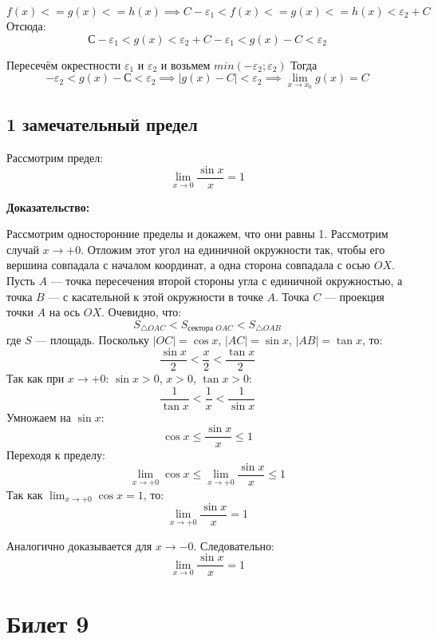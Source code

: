 \documentclass{article}
\begin{document}
\begin{equation}
    f(x) <= g(x) <= h(x) \implies C-\varepsilon_1 < f(x) <= g(x) <= h(x) < \varepsilon_2 + C
\end{equation}
Отсюда:
\begin{equation}
    С - \varepsilon_1 < g(x) < \varepsilon_2 + C
    -\varepsilon_1 < g(x) - C < \varepsilon_2
\end{equation}

Пересечём окрестности $\varepsilon_1$ и $\varepsilon_2$ и возьмем $min(-\varepsilon_2; \varepsilon_2)$
Тогда
\begin{equation}
    -\varepsilon_2 < g(x) - С < \varepsilon_2 \implies |g(x) - C| < \varepsilon_2 \implies \lim_{x \to x_0} g(x) = C
\end{equation}

\subsection*{1 замечательный предел}
Рассмотрим предел:
\[
\lim_{x \to 0} \frac{\sin x}{x} = 1
\]

\textbf{Доказательство:}

Рассмотрим односторонние пределы и докажем, что они равны 1. Рассмотрим случай \( x \to +0 \). Отложим этот угол на единичной окружности так, чтобы его вершина совпадала с началом координат, а одна сторона совпадала с осью \( OX \). Пусть \( A \) — точка пересечения второй стороны угла с единичной окружностью, а точка \( B \) — с касательной к этой окружности в точке \( A \). Точка \( C \) — проекция точки \( A \) на ось \( OX \). Очевидно, что:
\[
S_{\triangle OAC} < S_{\text{сектора } OAC} < S_{\triangle OAB}
\]
где \( S \) — площадь. Поскольку \( |OC| = \cos x \), \( |AC| = \sin x \), \( |AB| = \tan x \), то:
\[
\frac{\sin x}{2} < \frac{x}{2} < \frac{\tan x}{2}
\]
Так как при \( x \to +0 \): \( \sin x > 0 \), \( x > 0 \), \( \tan x > 0 \):
\[
\frac{1}{\tan x} < \frac{1}{x} < \frac{1}{\sin x}
\]
Умножаем на \( \sin x \):
\[
\cos x \leq \frac{\sin x}{x} \leq 1
\]
Переходя к пределу:
\[
\lim_{x \to +0} \cos x \leq \lim_{x \to +0} \frac{\sin x}{x} \leq 1
\]
Так как \( \lim_{x \to +0} \cos x = 1 \), то:
\[
\lim_{x \to +0} \frac{\sin x}{x} = 1
\]

Аналогично доказывается для \( x \to -0 \). Следовательно:
\[
\lim_{x \to 0} \frac{\sin x}{x} = 1
\]

\section{Билет 9}
\end{document}
